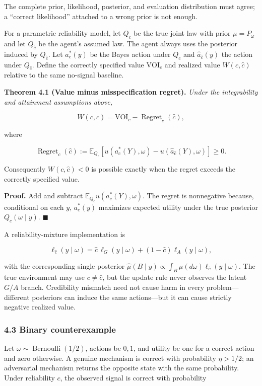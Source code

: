 \documentclass[
  11pt]{article}
\begin{document}
The complete prior, likelihood, posterior, and evaluation distribution
must agree; a ``correct likelihood'' attached to a wrong prior is not
enough.

For a parametric reliability model, let \(Q_c\) be the true joint law
with prior \(\mu=P_\omega\) and let \(Q_{\hat c}\) be the agent's
assumed law. The agent always uses the posterior induced by
\(Q_{\hat c}\). Let \(a_c^*(y)\) be the Bayes action under \(Q_c\) and
\(\widehat a_{\hat c}(y)\) the action under \(Q_{\hat c}\). Define the
correctly specified value \(\mathrm{VOI}_c\) and realized value
\(W(c,\hat c)\) relative to the same no-signal baseline.

\textbf{Theorem 4.1 (Value minus misspecification regret).} \emph{Under
the integrability and attainment assumptions above,}

\[W(c,\hat c)=\mathrm{VOI}_c-\operatorname{Regret}_c(\hat c),\]

where

\[\operatorname{Regret}_c(\hat c):=\mathbb E_{Q_c}\!\left[u(a_c^*(Y),\omega)-u(\widehat a_{\hat c}(Y),\omega)\right]\ge0.\]

Consequently \(W(c,\hat c)<0\) is possible exactly when the regret
exceeds the correctly specified value.

\textbf{Proof.} Add and subtract \(\mathbb E_{Q_c}u(a_c^*(Y),\omega)\).
The regret is nonnegative because, conditional on each \(y\),
\(a_c^*(y)\) maximizes expected utility under the true posterior
\(Q_c(\omega\mid y)\). \(\blacksquare\)

A reliability-mixture implementation is

\[\ell_{\hat c}(y\mid\omega)=\hat c\,\ell_G(y\mid\omega)+(1-\hat c)\ell_A(y\mid\omega),\]

with the corresponding single posterior
\(\widehat\mu(B\mid y)\propto\int_B\mu(d\omega)\ell_{\hat c}(y\mid\omega)\).
The true environment may use \(c\ne\hat c\), but the update rule never
observes the latent \(G/A\) branch. Credibility mismatch need not cause
harm in every problem---different posteriors can induce the same
actions---but it can cause strictly negative realized value.

\subsubsection{4.3 Binary counterexample}\label{binary-counterexample}

Let \(\omega\sim\operatorname{Bernoulli}(1/2)\), actions be \(0,1\), and
utility be one for a correct action and zero otherwise. A genuine
mechanism is correct with probability \(\eta>1/2\); an adversarial
mechanism returns the opposite state with the same probability. Under
reliability \(c\), the observed signal is correct with probability
\end{document}
